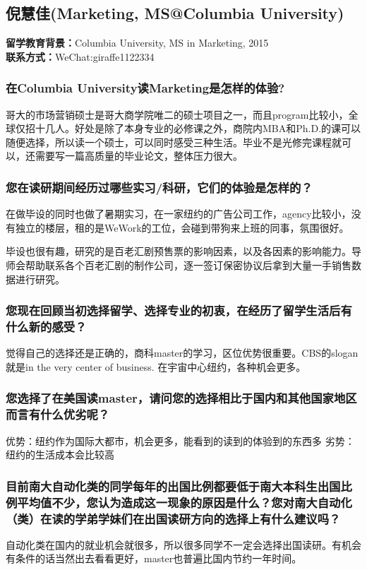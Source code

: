 \documentclass[a4paper,UTF8]{book}
\begin{document}
\clearpage
\subsection{倪慧佳(Marketing, MS@Columbia University)}
    \textbf{留学教育背景：}Columbia University, MS in Marketing, 2015\\
    \textbf{联系方式：}WeChat:giraffe1122334

    \subsubsection*{在Columbia University读Marketing是怎样的体验?}
    哥大的市场营销硕士是哥大商学院唯二的硕士项目之一，而且program比较小，全球仅招十几人。好处是除了本身专业的必修课之外，商院内MBA和Ph.D.的课可以随便选择，所以读一个硕士，可以同时感受三种生活。毕业不是光修完课程就可以，还需要写一篇高质量的毕业论文，整体压力很大。
    \subsubsection*{您在读研期间经历过哪些实习/科研，它们的体验是怎样的？}
    在做毕设的同时也做了暑期实习，在一家纽约的广告公司工作，agency比较小，没有独立的楼层，租的是WeWork的工位，会碰到带狗来上班的同事，氛围很好。

    毕设也很有趣，研究的是百老汇剧预售票的影响因素，以及各因素的影响能力。导师会帮助联系各个百老汇剧的制作公司，逐一签订保密协议后拿到大量一手销售数据进行研究。
    \subsubsection*{您现在回顾当初选择留学、选择专业的初衷，在经历了留学生活后有什么新的感受？}
    觉得自己的选择还是正确的，商科master的学习，区位优势很重要。CBS的slogan就是in the very center of business.  在宇宙中心纽约，各种机会更多。 
    \subsubsection*{您选择了在美国读master，请问您的选择相比于国内和其他国家地区而言有什么优劣呢？}
    优势：纽约作为国际大都市，机会更多，能看到的读到的体验到的东西多
    劣势：纽约的生活成本会比较高
    \subsubsection*{目前南大自动化类的同学每年的出国比例都要低于南大本科生出国比例平均值不少，您认为造成这一现象的原因是什么？您对南大自动化（类）在读的学弟学妹们在出国读研方向的选择上有什么建议吗？}
    自动化类在国内的就业机会就很多，所以很多同学不一定会选择出国读研。有机会有条件的话当然出去看看更好，master也普遍比国内节约一年时间。
\end{document}
